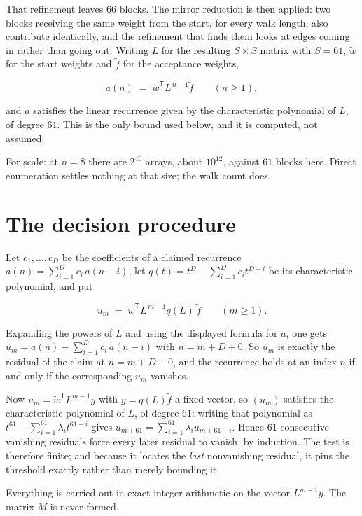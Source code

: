 \documentclass[11pt]{article}
\theoremstyle{definition}
\begin{document}
That refinement leaves $66$ blocks. The mirror reduction is then applied: two blocks receiving the same weight from the start, for every walk length, also contribute identically, and the refinement that finds them looks at edges coming in rather than going out. Writing $L$ for the resulting $S \times S$ matrix with $S = 61$, $\tilde w$ for the start weights and $\tilde f$ for the acceptance weights,

\[a(n) \;=\; \tilde w^{\mathsf T} L^{\,n-1} \tilde f \qquad (n \ge 1),\]

and $a$ satisfies the linear recurrence given by the characteristic polynomial of $L$, of degree $61$. This is the only bound used below, and it is computed, not assumed.

For scale: at $n = 8$ there are $2^{40}$ arrays, about $10^{12}$, against $61$ blocks here. Direct enumeration settles nothing at that size; the walk count does.

\section{The decision procedure}

Let $c_1,\dots,c_D$ be the coefficients of a claimed recurrence $a(n) = \sum_{i=1}^{D} c_i\,a(n-i)$, let $q(t) = t^{D} - \sum_{i=1}^{D} c_i t^{D-i}$ be its characteristic polynomial, and put

\[u_m \;=\; \tilde w^{\mathsf T} L^{\,m-1} q(L)\,\tilde f \qquad (m \ge 1).\]

Expanding the powers of $L$ and using the displayed formula for $a$, one gets $u_m = a(n) - \sum_{i=1}^{D} c_i\,a(n-i)$ with $n = m + D + 0$. So $u_m$ is exactly the residual of the claim at $n = m + D + 0$, and the recurrence holds at an index $n$ if and only if the corresponding $u_m$ vanishes.

Now $u_m = \tilde w^{\mathsf T} L^{m-1} y$ with $y = q(L)\tilde f$ a fixed vector, so $(u_m)$ satisfies the characteristic polynomial of $L$, of degree $61$: writing that polynomial as $t^{61} - \sum_{i=1}^{61} \lambda_i t^{61-i}$ gives $u_{m+61} = \sum_{i=1}^{61} \lambda_i u_{m+61-i}$. Hence $61$ consecutive vanishing residuals force every later residual to vanish, by induction. The test is therefore finite; and because it locates the {\itshape last} nonvanishing residual, it pins the threshold exactly rather than merely bounding it.

Everything is carried out in exact integer arithmetic on the vector $L^{m-1}y$. The matrix $M$ is never formed.
\end{document}
